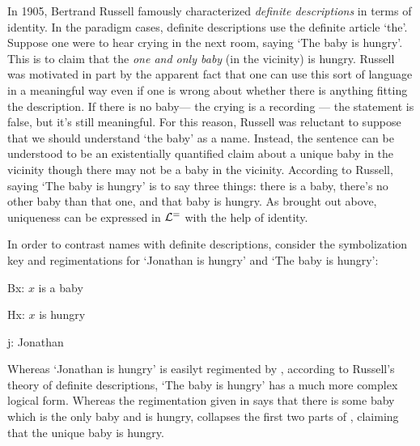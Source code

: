 In 1905, Bertrand Russell famously characterized \emph{definite descriptions} in terms of identity.
In the paradigm cases, definite descriptions use the definite article `the'.
Suppose one were to hear crying in the next room, saying `The baby is hungry'.
This is to claim that the \emph{one and only baby} (in the vicinity) is hungry.
Russell was motivated in part by the apparent fact that one can use this sort of language in a meaningful way even if one is wrong about whether there is anything fitting the description.
If there is no baby--- the crying is a recording --- the statement is false, but it's still meaningful.
For this reason, Russell was reluctant to suppose that we should understand `the baby' as a name.
Instead, the sentence can be understood to be an existentially quantified claim about a unique baby in the vicinity though there may not be a baby in the vicinity.
According to Russell, saying `The baby is hungry' is to say three things: there is a baby, there's no other baby than that one, and that baby is hungry.
As brought out above, uniqueness can be expressed in $\mathcal{L}^{=}$ with the help of identity. 

In order to contrast names with definite descriptions, consider the symbolization key and regimentations for `Jonathan is hungry' and `The baby is hungry':

\begin{multicols}{2}
  \begin{ekey}
    \item[Bx:] $x$ is a baby
    \item[Hx:] $x$ is hungry
    \item[j:] Jonathan
  \end{ekey}
  
  \columnbreak

  \begin{earg} \label{baby}
  \end{earg}
\end{multicols}
Whereas `Jonathan is hungry' is easilyt regimented by , according to Russell's theory of definite descriptions, `The baby is hungry' has a much more complex logical form.
Whereas the regimentation given in  says that there is some baby which is the only baby and is hungry,  collapses the first two parts of , claiming that the unique baby is hungry.

